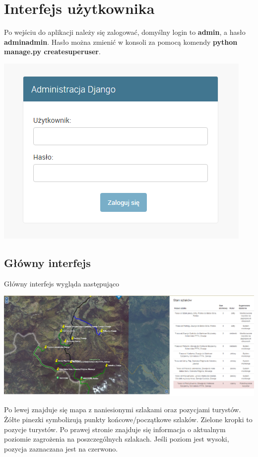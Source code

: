 \documentclass[a4paper,12pt]{article}
\begin{document}
\section{Interfejs użytkownika}
Po wejściu do aplikacji należy się zalogować, domyślny login to \textbf{admin}, a hasło \textbf{adminadmin}. Hasło można zmienić w konsoli za pomocą komendy \textbf{python manage.py createsuperuser}.
\begin{center}
\includegraphics[scale=1]{ui0.png}
\end{center}
\subsection{Główny interfejs}
Główny interfejs wygląda następująco
\begin{center}
\includegraphics[scale=0.4]{ui1.png}
\end{center}
Po lewej znajduje się mapa z naniesionymi szlakami oraz pozycjami turystów. Żółte pinezki symbolizują punkty końcowe/początkowe szlaków. Zielone kropki to pozycje turystów. Po prawej stronie znajduje się informacja o aktualnym poziomie zagrożenia na poszczególnych szlakach. Jeśli poziom jest wysoki, pozycja zaznaczana jest na czerwono.
\end{document}
